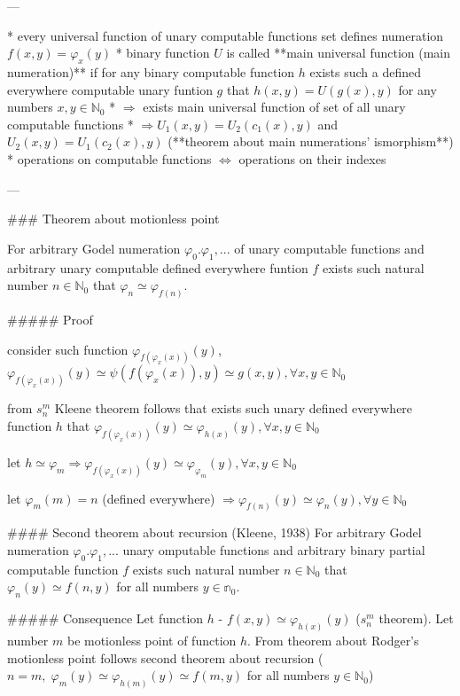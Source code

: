 \documentclass[12pt,letterpaper]{report}
\begin{document}
---

* every universal function of unary computable functions set defines numeration $f(x, y) = \varphi_x(y)$
* binary function $U$ is called **main universal function (main numeration)** if for any binary computable function $h$ exists such a defined everywhere computable unary funtion $g$ that $h(x, y) = U(g(x), y)$ for any numbers $x, y \in \mathbb{N}_0$
* $\Rightarrow$ exists main universal function of set of all unary computable functions
* $\Rightarrow U_1(x, y) = U_2(c_1(x), y)$ and $U_2(x, y) = U_1(c_2(x), y)$ (**theorem about main numerations' ismorphism**)
* operations on computable functions $\Leftrightarrow$ operations on their indexes

---

### Theorem about motionless point

For arbitrary Godel numeration $\varphi_0. \varphi_1, ...$ of unary computable functions and arbitrary unary computable defined everywhere funtion $f$ exists such natural number $n \in \mathbb{N}_0$ that $\varphi_n \simeq \varphi_{f(n)}$.

##### Proof
\item consider such function $\varphi_{f(\varphi_x(x))}(y)$, $\varphi_{f(\varphi_x(x))}(y) \simeq \psi(f(\varphi_x(x)), y) \simeq g(x, y) , \forall x, y \in \mathbb{N}_0$
\item from $s_n^m$ Kleene theorem follows that exists such unary defined everywhere function $h$ that $\varphi_{f(\varphi_x(x))}(y) \simeq \varphi_{h(x)}(y), \forall x, y \in \mathbb{N}_0$
\item let $h \simeq \varphi_m \Rightarrow \varphi_{f(\varphi_x(x))}(y) \simeq \varphi_{\varphi_m}(y), \forall x, y \in \mathbb{N}_0$
\item let $\varphi_m(m) = n$ (defined everywhere) $\Rightarrow \varphi_{f(n)}(y) \simeq \varphi_n(y), \forall y \in \mathbb{N}_0$

#### Second theorem about recursion (Kleene, 1938)
For arbitrary Godel numeration $\varphi_0. \varphi_1, ...$ unary omputable functions and arbitrary binary partial computable function $f$ exists such natural number $n \in \mathbb{N}_0$ that $\varphi_n(y) \simeq f(n ,y)$ for all numbers $y \in \mathbb{n}_0$.

##### Consequence
Let  function $h$ - $f(x, y) \simeq \varphi_{h(x)}(y)$ ($s_n^m$ theorem).
Let number $m$ be motionless point of function $h$.
From theorem about Rodger's motionless point follows second theorem about recursion ($n=m, \; \varphi_m(y) \simeq \varphi_{h(m)}(y) \simeq f(m,y)$ for all numbers $y \in \mathbb{N}_0$)
\end{document}
